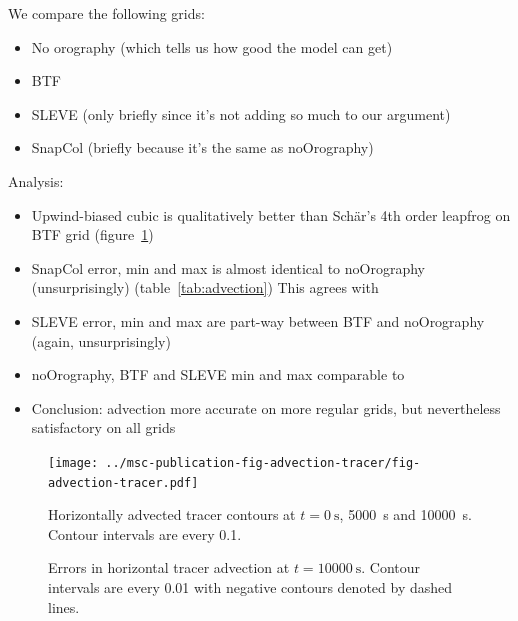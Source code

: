 \documentclass[twocol]{ametsoc}
\begin{document}
We compare the following grids:
\begin{itemize}
	\item No orography (which tells us how good the model can get)
	\item BTF
	\item SLEVE (only briefly since it's not adding so much to our argument)
	\item SnapCol (briefly because it's the same as noOrography)
\end{itemize}


Analysis:
\begin{itemize}
	\item Upwind-biased cubic is qualitatively better than Sch\"ar's 4th order leapfrog on BTF grid (figure~\ref{fig:advection-tracer})
	\item SnapCol error, min and max is almost identical to noOrography (unsurprisingly) (table~\ref{tab:advection})  This agrees with \citet{good2014}
	\item SLEVE error, min and max are part-way between BTF and noOrography (again, unsurprisingly)
	\item noOrography, BTF and SLEVE min and max comparable to \citet{schaer2002}
	\item Conclusion: advection more accurate on more regular grids, but nevertheless satisfactory on all grids
\end{itemize}

\begin{figure}
	\centering
	\texttt{[image: ../msc-publication-fig-advection-tracer/fig-advection-tracer.pdf]}

%	

%
	\caption{Horizontally advected tracer contours at $t = \SI{0}{\second}$, \SI{5000}{\second} and \SI{10000}{\second}.    Contour intervals are every 0.1.}
	\label{fig:advection-tracer}
\end{figure}

\begin{figure}
	\centering
	\caption{Errors in horizontal tracer advection at $t = \SI{10000}{\second}$.    Contour intervals are every 0.01 with negative contours denoted by dashed lines.}
	\label{fig:advection-error}
\end{figure}
\end{document}
